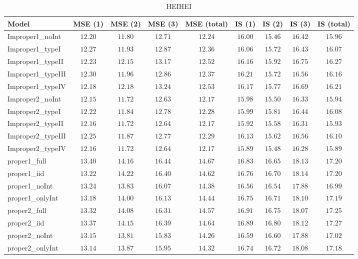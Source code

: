 \begin{table}

\caption{\label{tab:model-choice-sc11}HEIHEI}
\centering
\begin{tabular}{lcccccccc}
\hline
Model  & MSE (1) & MSE (2) & MSE (3) & MSE (total) & IS (1) & IS (2) & IS (3) & \multicolumn{1}{c}{IS (total)} \\ 
\hline
Improper1_noInt  & $12.20$ & $11.80$ & $12.71$ & $12.24$ & $16.00$ & $15.46$ & $16.42$ & $15.96$ \\
Improper1_typeI  & $12.27$ & $11.93$ & $12.87$ & $12.36$ & $16.06$ & $15.72$ & $16.43$ & $16.07$ \\
Improper1_typeII  & $12.23$ & $12.15$ & $13.17$ & $12.52$ & $16.16$ & $15.92$ & $16.75$ & $16.27$ \\
Improper1_typeIII  & $12.30$ & $11.96$ & $12.86$ & $12.37$ & $16.21$ & $15.72$ & $16.56$ & $16.16$ \\
Improper1_typeIV  & $12.18$ & $12.18$ & $13.24$ & $12.53$ & $16.17$ & $15.77$ & $16.69$ & $16.21$ \\
Improper2_noInt  & $12.15$ & $11.72$ & $12.63$ & $12.17$ & $15.98$ & $15.50$ & $16.33$ & $15.94$ \\
Improper2_typeI  & $12.22$ & $11.84$ & $12.78$ & $12.28$ & $15.99$ & $15.81$ & $16.44$ & $16.08$ \\
Improper2_typeII  & $12.16$ & $11.72$ & $12.64$ & $12.17$ & $15.92$ & $15.58$ & $16.31$ & $15.93$ \\
Improper2_typeIII  & $12.25$ & $11.87$ & $12.77$ & $12.29$ & $16.13$ & $15.62$ & $16.56$ & $16.10$ \\
Improper2_typeIV  & $12.16$ & $11.72$ & $12.64$ & $12.17$ & $15.89$ & $15.48$ & $16.28$ & $15.89$ \\
proper1_full  & $13.40$ & $14.16$ & $16.44$ & $14.67$ & $16.83$ & $16.65$ & $18.13$ & $17.20$ \\
proper1_iid  & $13.22$ & $14.22$ & $16.40$ & $14.62$ & $16.76$ & $16.70$ & $18.14$ & $17.20$ \\
proper1_noInt  & $13.24$ & $13.83$ & $16.07$ & $14.38$ & $16.56$ & $16.54$ & $17.88$ & $16.99$ \\
proper1_onlyInt  & $13.18$ & $14.00$ & $16.13$ & $14.44$ & $16.75$ & $16.71$ & $18.10$ & $17.19$ \\
proper2_full  & $13.32$ & $14.08$ & $16.31$ & $14.57$ & $16.91$ & $16.75$ & $18.07$ & $17.25$ \\
proper2_iid  & $13.37$ & $14.15$ & $16.39$ & $14.64$ & $16.89$ & $16.80$ & $18.12$ & $17.27$ \\
proper2_noInt  & $13.15$ & $13.81$ & $15.83$ & $14.26$ & $16.59$ & $16.60$ & $17.88$ & $17.02$ \\
proper2_onlyInt  & $13.14$ & $13.87$ & $15.95$ & $14.32$ & $16.74$ & $16.72$ & $18.08$ & $17.18$ \\
\hline 
\end{tabular}

\end{table}